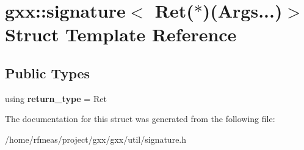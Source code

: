 \hypertarget{structgxx_1_1signature_3_01Ret_07_5_08_07Args_8_8_8_08_4}{}\section{gxx\+:\+:signature$<$ Ret($\ast$)(Args...)$>$ Struct Template Reference}
\label{structgxx_1_1signature_3_01Ret_07_5_08_07Args_8_8_8_08_4}
\subsection*{Public Types}
\begin{DoxyCompactItemize}
\item 
using {\bfseries return\+\_\+type} = Ret\hypertarget{structgxx_1_1signature_3_01Ret_07_5_08_07Args_8_8_8_08_4_a4806e2c154101359b81b61a521735999}{}\label{structgxx_1_1signature_3_01Ret_07_5_08_07Args_8_8_8_08_4_a4806e2c154101359b81b61a521735999}

\end{DoxyCompactItemize}


The documentation for this struct was generated from the following file\+:\begin{DoxyCompactItemize}
\item 
/home/rfmeas/project/gxx/gxx/util/signature.\+h\end{DoxyCompactItemize}
